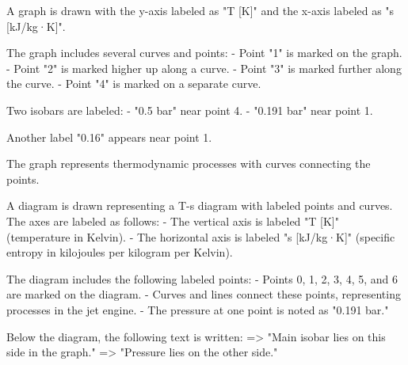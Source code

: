 A graph is drawn with the y-axis labeled as "T [K]" and the x-axis labeled as "s [kJ/kg·K]".  

The graph includes several curves and points:  
- Point "1" is marked on the graph.  
- Point "2" is marked higher up along a curve.  
- Point "3" is marked further along the curve.  
- Point "4" is marked on a separate curve.  

Two isobars are labeled:  
- "0.5 bar" near point 4.  
- "0.191 bar" near point 1.  

Another label "0.16" appears near point 1.  

The graph represents thermodynamic processes with curves connecting the points.

A diagram is drawn representing a T-s diagram with labeled points and curves. The axes are labeled as follows:  
- The vertical axis is labeled "T [K]" (temperature in Kelvin).  
- The horizontal axis is labeled "s [kJ/kg·K]" (specific entropy in kilojoules per kilogram per Kelvin).  

The diagram includes the following labeled points:  
- Points 0, 1, 2, 3, 4, 5, and 6 are marked on the diagram.  
- Curves and lines connect these points, representing processes in the jet engine.  
- The pressure at one point is noted as "0.191 bar."  

Below the diagram, the following text is written:  
=> "Main isobar lies on this side in the graph."  
=> "Pressure lies on the other side."